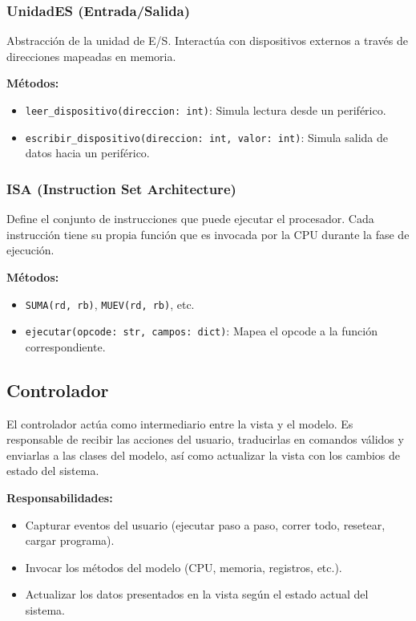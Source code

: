 \documentclass{article}
\begin{document}
\subsubsection*{UnidadES (Entrada/Salida)}

Abstracción de la unidad de E/S. Interactúa con dispositivos externos a través de direcciones
mapeadas en memoria.

\textbf{Métodos:}
\begin{itemize}
  \item \texttt{leer\_dispositivo(direccion: int)}: Simula lectura desde un periférico.
  \item \texttt{escribir\_dispositivo(direccion: int, valor: int)}: Simula salida de datos hacia
        un periférico.
\end{itemize}

\subsubsection*{ISA (Instruction Set Architecture)}

Define el conjunto de instrucciones que puede ejecutar el procesador. Cada instrucción tiene
su propia función que es invocada por la CPU durante la fase de ejecución.

\textbf{Métodos:}
\begin{itemize}
  \item \texttt{SUMA(rd, rb)}, \texttt{MUEV(rd, rb)}, etc.
  \item \texttt{ejecutar(opcode: str, campos: dict)}: Mapea el opcode a la función correspondiente.
\end{itemize}


\subsection{Controlador}

El controlador actúa como intermediario entre la vista y el modelo.
Es responsable de recibir las acciones del usuario, traducirlas en comandos válidos y
enviarlas a las clases del modelo, así como actualizar la vista con los cambios
de estado del sistema.

\textbf{Responsabilidades:}
\begin{itemize}
  \item Capturar eventos del usuario (ejecutar paso a paso, correr todo, resetear, cargar programa).
  \item Invocar los métodos del modelo (CPU, memoria, registros, etc.).
  \item Actualizar los datos presentados en la vista según el estado actual del sistema.
\end{itemize}
\end{document}
